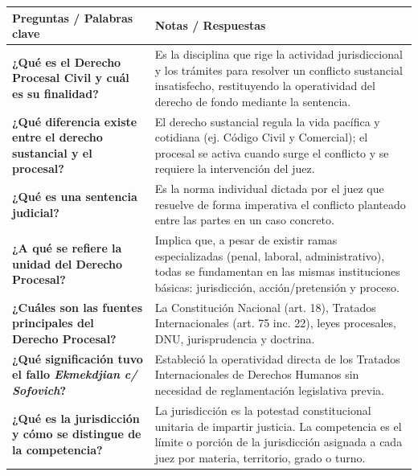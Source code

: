 \documentclass[12pt,oneside]{book}
\begin{document}
\begin{table}[H]
\centering
\begin{tabularx}{\textwidth}{
    >{\raggedright\arraybackslash}p{}
    >{\raggedright\arraybackslash}X
}
\toprule
\textbf{Preguntas / Palabras clave} & \textbf{Notas / Respuestas} \\
\midrule

\textbf{¿Qué es el Derecho Procesal Civil y cuál es su finalidad?} &
Es la disciplina que rige la actividad jurisdiccional y los trámites para resolver un conflicto sustancial insatisfecho, restituyendo la operatividad del derecho de fondo mediante la sentencia. \\

\textbf{¿Qué diferencia existe entre el derecho sustancial y el procesal?} &
El derecho sustancial regula la vida pacífica y cotidiana (ej. Código Civil y Comercial); el procesal se activa cuando surge el conflicto y se requiere la intervención del juez. \\

\textbf{¿Qué es una sentencia judicial?} &
Es la norma individual dictada por el juez que resuelve de forma imperativa el conflicto planteado entre las partes en un caso concreto. \\

\textbf{¿A qué se refiere la unidad del Derecho Procesal?} &
Implica que, a pesar de existir ramas especializadas (penal, laboral, administrativo), todas se fundamentan en las mismas instituciones básicas: jurisdicción, acción/pretensión y proceso. \\

\textbf{¿Cuáles son las fuentes principales del Derecho Procesal?} &
La Constitución Nacional (art. 18), Tratados Internacionales (art. 75 inc. 22), leyes procesales, DNU, jurisprudencia y doctrina. \\

\textbf{¿Qué significación tuvo el fallo \textit{Ekmekdjian c/ Sofovich}?} &
Estableció la operatividad directa de los Tratados Internacionales de Derechos Humanos sin necesidad de reglamentación legislativa previa. \\

\textbf{¿Qué es la jurisdicción y cómo se distingue de la competencia?} &
La jurisdicción es la potestad constitucional unitaria de impartir justicia. La competencia es el límite o porción de la jurisdicción asignada a cada juez por materia, territorio, grado o turno. \\


\end{tabularx}
\end{table}
\end{document}

